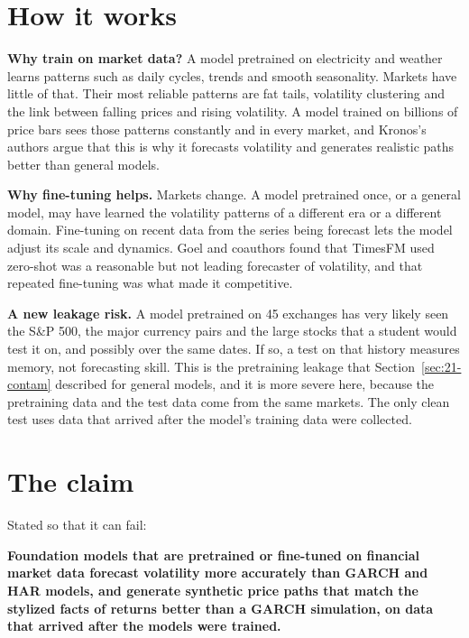\section{How it works}
\label{sec:22-how}

\textbf{Why train on market data?} A model pretrained on electricity and weather learns patterns such as daily cycles, trends and smooth seasonality. Markets have little of that. Their most reliable patterns are fat tails, volatility clustering and the link between falling prices and rising volatility. A model trained on billions of price bars sees those patterns constantly and in every market, and Kronos's authors argue that this is why it forecasts volatility and generates realistic paths better than general models.

\textbf{Why fine-tuning helps.} Markets change. A model pretrained once, or a general model, may have learned the volatility patterns of a different era or a different domain. Fine-tuning on recent data from the series being forecast lets the model adjust its scale and dynamics. Goel and coauthors found that TimesFM used zero-shot was a reasonable but not leading forecaster of volatility, and that repeated fine-tuning was what made it competitive.

\textbf{A new leakage risk.} A model pretrained on 45 exchanges has very likely seen the S\&P 500, the major currency pairs and the large stocks that a student would test it on, and possibly over the same dates. If so, a test on that history measures memory, not forecasting skill. This is the pretraining leakage that Section~\ref{sec:21-contam} described for general models, and it is more severe here, because the pretraining data and the test data come from the same markets. The only clean test uses data that arrived after the model's training data were collected.

\section{The claim}
\label{sec:22-claim}

Stated so that it can fail:

\begin{callout}
\textbf{Foundation models that are pretrained or fine-tuned on financial market data forecast volatility more accurately than GARCH and HAR models, and generate synthetic price paths that match the stylized facts of returns better than a GARCH simulation, on data that arrived after the models were trained.}
\end{callout}

